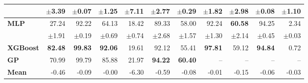 \begin{table}[!htbp]
\begin{tabular}{lrrrrrrrrrr}
 & $\pm$3.39 & $\pm$0.07 & $\pm$1.25 & $\pm$7.11 & $\pm$2.77 & $\pm$0.29 & $\pm$1.82 & $\pm$2.98 & $\pm$0.08 & $\pm$1.10 \\
\midrule
\textbf{MLP} & 27.24 & 92.22 & 64.13 & 18.42 & 89.33 & 58.00 & 92.24 & \textbf{60.58} & 94.25 & 2.34 \\
 & $\pm$1.91 & $\pm$0.19 & $\pm$0.69 & $\pm$0.74 & $\pm$2.68 & $\pm$1.57 & $\pm$1.30 & $\pm$2.14 & $\pm$0.45 & $\pm$0.03 \\
\midrule
\textbf{XGBoost} & \textbf{82.48} & \textbf{99.83} & \textbf{92.06} & 19.61 & 92.12 & 55.41 & \textbf{97.81} & 59.12 & \textbf{94.84} & 0.72 \\
\midrule
\textbf{GP} & 70.99 & 99.79 & 85.88 & 21.97 & \textbf{94.22} & \textbf{60.40} & -- & -- & -- & -- \\
\midrule
\textbf{Mean} & -0.46 & -0.09 & -0.00 & -6.30 & -0.59 & -0.08 & -0.01 & -0.15 & -0.06 & -0.03 \\
\bottomrule
\end{tabular}
\end{table}